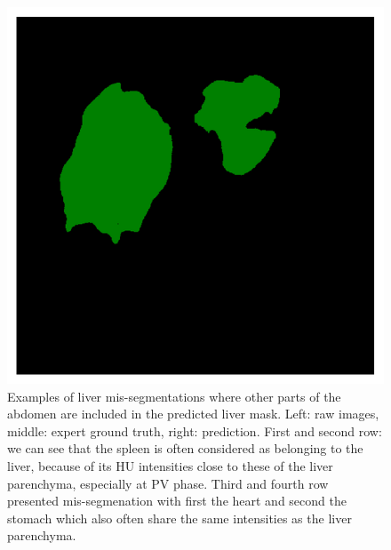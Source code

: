 \begin{figure}[!ht]
\begin{minipage}{4cm}
	\end{minipage} \hspace{-0.3cm}
	\begin{minipage}{4cm}
		\includegraphics[width=\linewidth]{images/ResizeLiverVE_Pred_Pat1_1}
	\end{minipage}
	\caption{Examples of liver mis-segmentations where other parts of the abdomen are included in the predicted liver mask. Left: raw images, middle: expert ground truth, right: prediction. First and second row: we can see that the spleen is often considered as belonging to the liver, because of its HU intensities close to these of the liver parenchyma, especially at PV phase. Third and fourth row presented mis-segmenation with first the heart and second the stomach which also often share the same intensities as the liver parenchyma.}
	\label{fig:missegmentation_Liver_IJCARS}
\end{figure}

